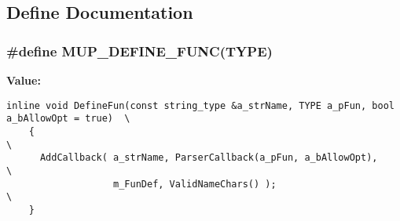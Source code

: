 \subsection{Define Documentation}
\subsubsection[MUP\_\-DEFINE\_\-FUNC]{\setlength{\rightskip}{0pt plus 5cm}\#define MUP\_\-DEFINE\_\-FUNC(TYPE)}\label{muParserBase_8h_f2dfa18864cf91426f80969960372761}


\textbf{Value:}

\begin{Code}\begin{verbatim}inline void DefineFun(const string_type &a_strName, TYPE a_pFun, bool a_bAllowOpt = true)  \
    {                                                                                   \
      AddCallback( a_strName, ParserCallback(a_pFun, a_bAllowOpt),                      \
                   m_FunDef, ValidNameChars() );                                        \
    }
\end{verbatim}
\end{Code}

